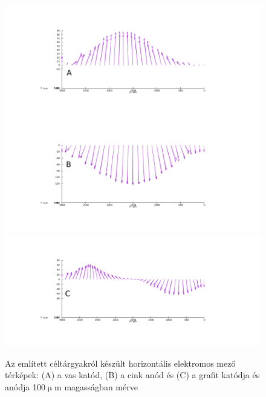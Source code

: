 \begin{figure}
\centering
\includegraphics[width=1\textwidth]{img/mérések/Fe_h100.pdf}
\includegraphics[width=1\textwidth]{img/mérések/Zn_h100.pdf}
\includegraphics[width=1\textwidth]{img/mérések/grafit_h100.pdf}

\caption{Az említett céltárgyakról készült horizontális elektromos mező térképek:
(A) a vas katód, (B) a cink anód és (C) a grafit katódja és anódja 100$\upmu$m magasságban mérve}
\label{fig:field_h}
\end{figure}

